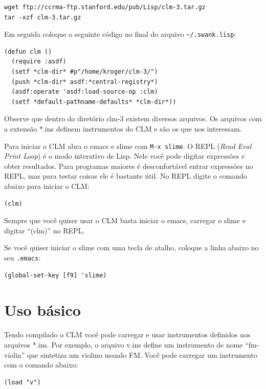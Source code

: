 \documentclass[12pt,brazil]{book}
\begin{document}
\begin{verbatim}
wget ftp://ccrma-ftp.stanford.edu/pub/Lisp/clm-3.tar.gz
tar -xzf clm-3.tar.gz
\end{verbatim}

Em seguida coloque o seguinte código no final do arquivo
\verb|~/.swank.lisp|:

\begin{verbatim}
(defun clm ()
  (require :asdf)
  (setf *clm-dir* #p"/home/kroger/clm-3/")
  (push *clm-dir* asdf:*central-registry*)
  (asdf:operate 'asdf:load-source-op :clm)
  (setf *default-pathname-defaults* *clm-dir*))
\end{verbatim}

Observe que dentro do diretório clm-3 existem diversos arquivos. Os
arquivos com a extensão *.ins definem instrumentos do CLM e são os que
nos interessam. 

Para iniciar o CLM abra o emacs e slime com \texttt{M-x slime}. O REPL
(\textit{Read Eval Print Loop}) é o modo interativo de Lisp. Nele você
pode digitar expressões e obter resultados. Para programas maiores é
desconfortável entrar expressões no REPL, mas para testar coisas ele é
bastante útil. No REPL digite o comando abaixo para iniciar o CLM:

\begin{verbatim}
(clm)
\end{verbatim}

Sempre que você quiser usar o CLM basta iniciar o emacs, carregar o
slime e digitar ``(clm)'' no REPL.

Se você quiser iniciar o slime com uma tecla de atalho, coloque a
linha abaixo no seu \texttt{.emacs}:

\begin{verbatim}
(global-set-key [f9] 'slime)
\end{verbatim}

\section{Uso básico}
\label{sec:uso-basico}

Tendo compilado o CLM você pode carregar e usar instrumentos definidos
nos arquivos *.ins. Por exemplo, o arquivo v.ins define um instrumento
de nome ``fm-violin'' que sintetiza um violino usando FM. Você pode
carregar um instrumento com o comando abaixo:

\begin{verbatim}
(load "v")
\end{verbatim}
\end{document}
